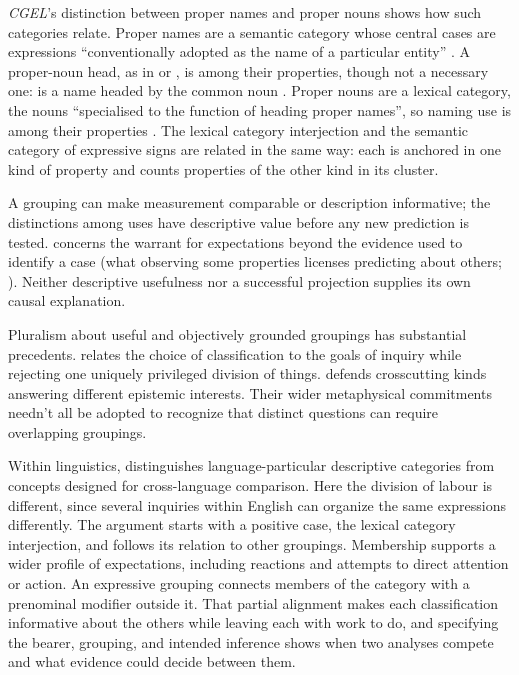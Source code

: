 \documentclass[12pt]{article}
\begin{document}
\textit{CGEL}'s distinction between proper names and proper nouns shows
how such categories relate. Proper names are a semantic category whose
central cases are expressions \enquote{conventionally adopted as the name
of a particular entity} \citep[515]{HuddlestonPullum2002}. A proper-noun
head, as in  or , is among their
properties, though not a necessary one:  is a name headed by the common noun .
Proper nouns are a lexical category, the nouns \enquote{specialised to the
function of heading proper names}, so naming use is among their properties
\citep[516]{HuddlestonPullum2002}. The lexical category interjection and the semantic category of expressive
signs are related in the same way: each is anchored in one kind of
property and counts properties of the other kind in its cluster.

A grouping can make measurement comparable or description informative;
the distinctions among  uses have descriptive value before
any new prediction is tested.  concerns the warrant
for expectations beyond the evidence used to identify a case (what
observing some properties licenses predicting about others;
\citealp{Goodman1955}). Neither descriptive usefulness nor a successful
projection supplies its own causal explanation.

Pluralism about useful and objectively grounded groupings has substantial
precedents. \textcite[5--7, 17--18]{dupre1993disorder} relates the choice of
classification to the goals of inquiry while rejecting one uniquely
privileged division of things. \textcite[63--64, 69--72]{khalidi2013}
defends crosscutting kinds answering different epistemic interests.
Their wider metaphysical commitments needn't all be adopted to recognize
that distinct questions can require overlapping groupings.

Within linguistics, \textcite[663, 666, 680]{haspelmath2010} distinguishes
language-particular descriptive categories from concepts designed for
cross-language comparison. Here the division of labour is different, since
several inquiries within English can organize the same expressions
differently. The argument starts with a positive case, the lexical
category interjection, and follows its relation to other groupings.
Membership supports a wider profile of expectations, including reactions
and attempts to direct attention or action. An expressive grouping connects
members of the category with a prenominal modifier outside it. That partial
alignment makes each classification informative about the others while
leaving each with work to do, and specifying the bearer, grouping, and
intended inference shows when two analyses compete and what evidence could
decide between them.
\end{document}
